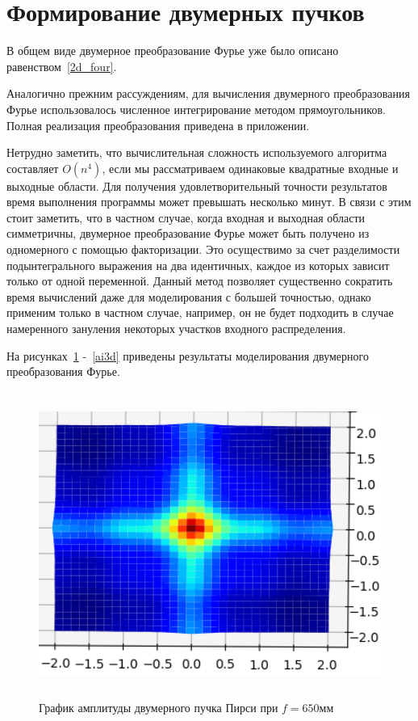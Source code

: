     \section{Формирование двумерных пучков}{
    В общем виде двумерное преобразование Фурье уже было описано равенством~\eqref{2d_four}.

    Аналогично прежним рассуждениям, для вычисления двумерного преобразования Фурье использовалось численное
    интегрирование методом прямоугольников. Полная реализация преобразования приведена в приложении.

    Нетрудно заметить, что вычислительная сложность используемого алгоритма составляет $O(n^4)$,
    если мы рассматриваем одинаковые квадратные входные и выходные области.
    Для получения удовлетворительный точности результатов время выполнения программы может
    превышать несколько минут. В связи с этим стоит заметить, что в частном случае,
    когда входная и выходная области симметричны, двумерное преобразование Фурье может
    быть получено из одномерного с помощью факторизации. Это осуществимо за счет разделимости подынтегрального
    выражения на два идентичных, каждое из которых зависит только от одной переменной.
    Данный метод позволяет существенно сократить время вычислений даже для моделирования с большей точностью,
    однако применим только в частном случае, например, он не будет подходить в случае
    намеренного зануления некоторых участков входного распределения.

    На рисунках~\ref{pe3d} -~\ref{ai3d} приведены результаты моделирования двумерного преобразования Фурье.
    \begin{figure}[H]
        \centering
        \includegraphics[height = 10cm]{plots/pe3d}
        \vspace{0.2cm}
        \caption{График амплитуды двумерного пучка Пирси при $f = 650$мм}
        \label{pe3d}
    \end{figure}

}
